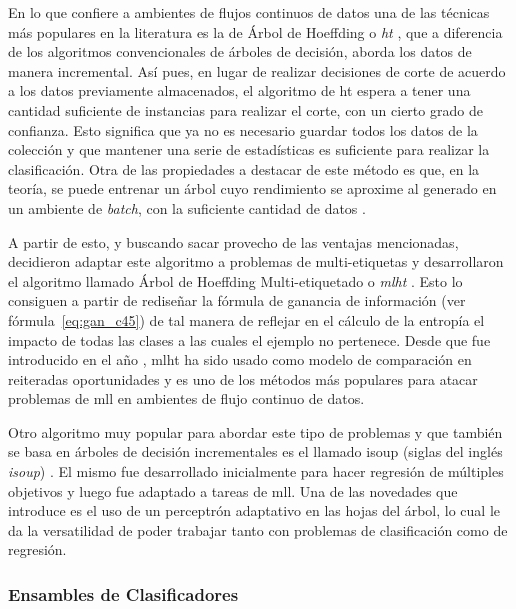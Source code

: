 En lo que confiere a ambientes de flujos continuos de datos una de las técnicas
más populares en la literatura es la de Árbol de Hoeffding o
\textit{\acrfull{ht}} \cite{domingos_mining_2002}, que a diferencia de los
algoritmos convencionales de árboles de decisión, aborda los datos de manera
incremental. Así pues, en lugar de realizar decisiones de corte de acuerdo a los
datos previamente almacenados, el algoritmo de \acrshort{ht} espera a tener una
cantidad suficiente de instancias para realizar el corte, con un cierto grado de
confianza. Esto significa que ya no es necesario guardar todos los datos de la
colección y que mantener una serie de estadísticas es suficiente para realizar
la clasificación. Otra de las propiedades a destacar de este método es que, en
la teoría, se puede entrenar un árbol cuyo rendimiento se aproxime al generado
en un ambiente de \textit{batch}, con la suficiente cantidad de datos
\cite{bifet_machine_2018}.

A partir de esto, y buscando sacar provecho de las ventajas mencionadas,
\citeauthor{read_scalable_2012} decidieron adaptar este algoritmo a problemas de
multi-etiquetas y desarrollaron el algoritmo llamado Árbol de Hoeffding
Multi-etiquetado o \textit{\acrfull{mlht}} \cite{read_scalable_2012}. Esto lo
consiguen a partir de rediseñar la fórmula de ganancia de información (ver
fórmula~\ref{eq:gan_c45}) de tal manera de reflejar en el cálculo de la entropía
el impacto de todas las clases a las cuales el ejemplo no pertenece. Desde que
fue introducido en el año \citeyear{read_scalable_2012}, \acrshort{mlht} ha sido
usado como modelo de comparación en reiteradas oportunidades
\cite{sousa_multi-label_2018} y es uno de los métodos más populares para atacar
problemas de \acrshort{mll} en ambientes de flujo continuo de datos.

Otro algoritmo muy popular para abordar este tipo de problemas y que también se
basa en árboles de decisión incrementales es el llamado \acrshort{isoup} (siglas
del inglés \textit{\acrlong{isoup}}) \cite{osojnik_multi-label_2017}. El mismo
fue desarrollado inicialmente para hacer regresión de múltiples objetivos y
luego fue adaptado a tareas de \acrshort{mll}. Una de las novedades que
introduce es el uso de un perceptrón adaptativo en las hojas del árbol, lo cual
le da la versatilidad de poder trabajar tanto con problemas de clasificación
como de regresión.

\subsubsection{Ensambles de Clasificadores}


